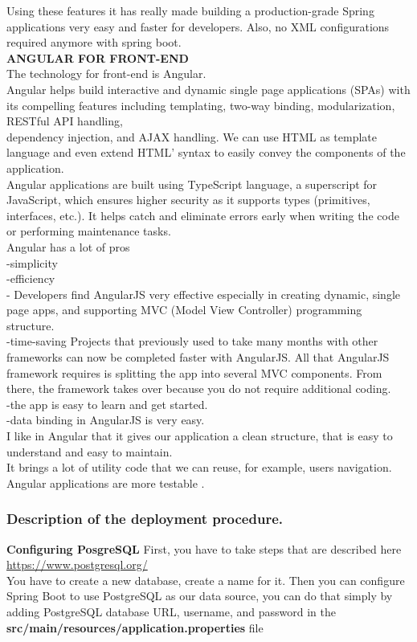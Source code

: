 \documentclass{scrartcl}
\begin{document}
Using these features it has really made building a production-grade Spring applications very easy and faster for developers. Also, no XML configurations required anymore with spring boot\cite{spring-docs}.\\

\textbf{ANGULAR FOR FRONT-END} \\
The technology for front-end is Angular.\\
Angular helps build interactive and dynamic single page applications (SPAs) with its compelling features including templating, two-way binding, modularization, RESTful API handling,\\ dependency injection, and AJAX handling. We can use HTML as template language and even extend HTML’ syntax to easily convey the components of the application.\\
Angular applications are built using TypeScript language, a superscript for JavaScript, which ensures higher security as it supports types (primitives, interfaces, etc.). It helps catch and eliminate errors early when writing the code or performing maintenance tasks.\\
Angular has a lot of pros\\
-simplicity\\
-efficiency\\
- Developers find AngularJS very effective especially in creating dynamic, single page apps, and supporting MVC (Model View Controller) programming structure.\\
-time-saving Projects that previously used to take many months with other frameworks can now be completed faster with AngularJS. All that AngularJS framework requires is splitting the app into several MVC components. From there, the framework takes over because you do not require additional coding.\\
-the app is easy to learn and get started.\\
-data binding in AngularJS is very easy.\\
I like in Angular that it gives our application a clean structure, that is easy to understand and easy to maintain.\\
It brings a lot of utility code that we can reuse, for example, users navigation. Angular applications are more testable \cite{5reason}.\\

\subsubsection{Description of the deployment procedure.}
\textbf{Configuring PosgreSQL}
First, you have to take steps that are described here \url{ https://www.postgresql.org/}\\ You have to create a new database, create a name for it.
 Then you can configure Spring Boot to use PostgreSQL as our data source, you can do that simply by adding PostgreSQL database URL, username, and password in the \textbf{src/main/resources/application.properties} file \\
 
\end{document}
